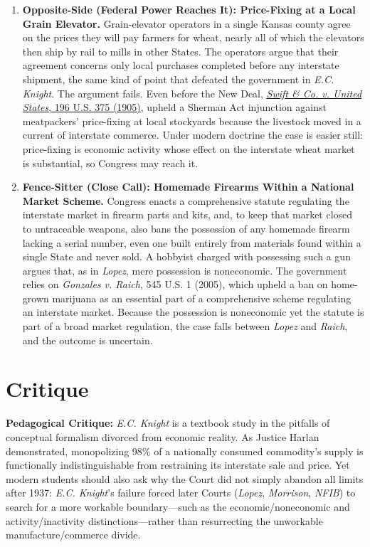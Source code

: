 \documentclass[12pt]{article}
\begin{document}
\begin{enumerate}
\item \textbf{Opposite-Side (Federal Power Reaches It): Price-Fixing at a Local Grain Elevator.} Grain-elevator operators in a single Kansas county agree on the prices they will pay farmers for wheat, nearly all of which the elevators then ship by rail to mills in other States. The operators argue that their agreement concerns only local purchases completed before any interstate shipment, the same kind of point that defeated the government in \textit{E.C. Knight}. The argument fails. Even before the New Deal, \href{https://supreme.justia.com/cases/federal/us/196/375/}{\textit{Swift \& Co. v. United States}, 196 U.S. 375 (1905)}, upheld a Sherman Act injunction against meatpackers' price-fixing at local stockyards because the livestock moved in a current of interstate commerce. Under modern doctrine the case is easier still: price-fixing is economic activity whose effect on the interstate wheat market is substantial, so Congress may reach it.

\item \textbf{Fence-Sitter (Close Call): Homemade Firearms Within a National Market Scheme.} Congress enacts a comprehensive statute regulating the interstate market in firearm parts and kits, and, to keep that market closed to untraceable weapons, also bans the possession of any homemade firearm lacking a serial number, even one built entirely from materials found within a single State and never sold. A hobbyist charged with possessing such a gun argues that, as in \textit{Lopez}, mere possession is noneconomic. The government relies on \textit{Gonzales v. Raich}, 545 U.S. 1 (2005), which upheld a ban on home-grown marijuana as an essential part of a comprehensive scheme regulating an interstate market. Because the possession is noneconomic yet the statute is part of a broad market regulation, the case falls between \textit{Lopez} and \textit{Raich}, and the outcome is uncertain.

\end{enumerate}

\section{Critique}
\textbf{Pedagogical Critique:} \textit{E.C. Knight} is a textbook study in the pitfalls of conceptual formalism divorced from economic reality. As Justice Harlan demonstrated, monopolizing 98\% of a nationally consumed commodity's supply is functionally indistinguishable from restraining its interstate sale and price. Yet modern students should also ask why the Court did not simply abandon all limits after 1937: \textit{E.C. Knight}'s failure forced later Courts (\textit{Lopez}, \textit{Morrison}, \textit{NFIB}) to search for a more workable boundary---such as the economic/noneconomic and activity/inactivity distinctions---rather than resurrecting the unworkable manufacture/commerce divide.
\end{document}
